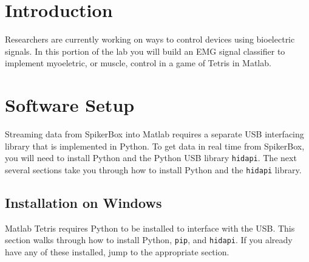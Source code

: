 \documentclass[10pt,oneside,a4paper]{article}
\begin{document}
\section{Introduction}
Researchers are currently working on ways to control devices using bioelectric signals. In this portion of the lab you will build an EMG signal classifier to implement myoeletric, or muscle, control in a game of Tetris in Matlab. 
\section{Software Setup}
Streaming data from SpikerBox into Matlab requires a separate USB interfacing library that is implemented in Python. To get data in real time from SpikerBox, you will need to install Python and the Python USB library \texttt{hidapi}. The next several sections take you through how to install Python and the \texttt{hidapi} library.
\subsection{Installation on Windows}
Matlab Tetris requires Python to be installed to interface with the USB. This section walks through how to install Python, \texttt{pip}, and \texttt{hidapi}. If you already have any of these installed, jump to the appropriate section.
\end{document}
